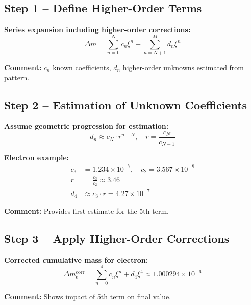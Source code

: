 \documentclass[12pt,a4paper]{article}
\begin{document}
\subsection{Step 1 – Define Higher-Order Terms}

\textbf{Series expansion including higher-order corrections:}
\begin{equation}
	\Delta m = \sum_{n=0}^{N} c_n \xi^n + \sum_{n=N+1}^{M} d_n \xi^n
\end{equation}

\textbf{Comment:} $c_n$ known coefficients, $d_n$ higher-order unknowns estimated from pattern.

\subsection{Step 2 – Estimation of Unknown Coefficients}

\textbf{Assume geometric progression for estimation:}
\begin{equation}
	d_n \approx c_N \cdot r^{n-N}, \quad r = \frac{c_N}{c_{N-1}}
\end{equation}

\textbf{Electron example:}
\begin{align}
	c_3 &= 1.234 \times 10^{-7}, \quad c_2 = 3.567 \times 10^{-8} \\
	r &= \frac{c_3}{c_2} \approx 3.46 \\
	d_4 &\approx c_3 \cdot r = 4.27 \times 10^{-7}
\end{align}

\textbf{Comment:} Provides first estimate for the 5th term.

\subsection{Step 3 – Apply Higher-Order Corrections}

\textbf{Corrected cumulative mass for electron:}
\begin{equation}
	\Delta m_e^\text{corr} = \sum_{n=0}^{4} c_n \xi^n + d_4 \xi^4 \approx 1.000294 \times 10^{-6}
\end{equation}

\textbf{Comment:} Shows impact of 5th term on final value.
\end{document}
